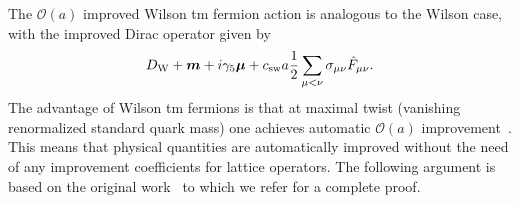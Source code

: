 The $\mathcal{O}(a)$ improved Wilson tm fermion action is analogous to the Wilson case, with the improved Dirac operator given by 
\begin{equation}
D_{\textrm W}+\boldsymbol{m}+i\gamma_5\boldsymbol{\mu}+c_{\textrm{sw}}a\frac{1}{2}\sum_{\mu<\nu}\sigma_{\mu\nu}\hat{F}_{\mu\nu}.
\end{equation}
The advantage of Wilson tm fermions is that at maximal twist (vanishing renormalized standard quark mass) one achieves automatic $\mathcal{O}(a)$ improvement~\citep{Frezzotti:2003ni,Shindler:2007vp}. This means that physical quantities are automatically improved without the need of any improvement coefficients for lattice operators. The following argument is based on the original work~\citep{Frezzotti:2003ni} to which we refer for a complete proof.


